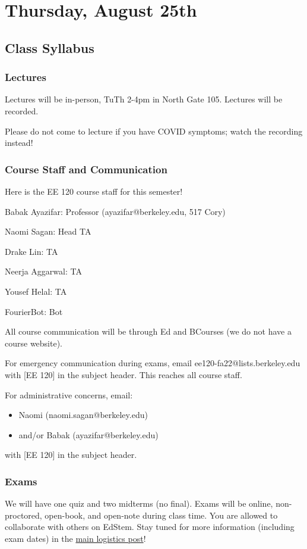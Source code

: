 \section{Thursday, August 25th}
\subsection{Class Syllabus}

\subsubsection{Lectures}
Lectures will be in-person, TuTh 2-4pm in North Gate 105. Lectures will be recorded.

Please do not come to lecture if you have COVID symptoms; watch the recording instead!

\subsubsection{Course Staff and Communication}

Here is the EE 120 course staff for this semester!

Babak Ayazifar: Professor (ayazifar@berkeley.edu, 517 Cory)

Naomi Sagan: Head TA

Drake Lin: TA

Neerja Aggarwal: TA

Yousef Helal: TA

FourierBot: Bot

All course communication will be through Ed and BCourses (we do not have a course website).

For emergency communication during exams, email ee120-fa22@lists.berkeley.edu with [EE 120] in the subject header. This reaches all course staff.

For administrative concerns, email:
\begin{itemize}
    \item Naomi (naomi.sagan@berkeley.edu) 
    \item and/or Babak (ayazifar@berkeley.edu)
\end{itemize}
with [EE 120] in the subject header.

\subsubsection{Exams}

We will have one quiz and two midterms (no final). Exams will be online, non-proctored, open-book, and open-note during class time. You are allowed to collaborate with others on EdStem. Stay tuned for more information (including exam dates) in the \href{https://edstem.org/us/courses/24721/discussion/1700156}{main logistics post}!

